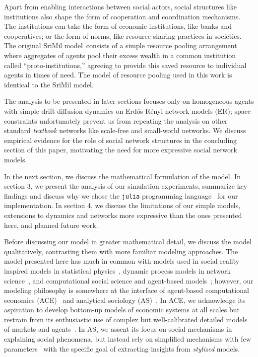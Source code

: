 \documentclass[sigconf]{acmart}
\begin{document}
Apart from enabling interactions between social actors, social structures like institutions also shape the form of cooperation and coordination mechanisms. The institutions can take the form of economic institutions, like banks and cooperatives; or the form of norms, like resource-sharing practices in societies. The original SriMil model~\cite{srimil}consists of a simple resource pooling arrangement where aggregates of agents pool their excess wealth in a common institution called ``proto-institutions,'' agreeing to provide this saved resource to individual agents in times of need. The model of resource pooling used in this work is identical to the SriMil model. 

The analysis to be presented in later sections focuses only on homogeneous agents with simple drift-diffusion dynamics on Erd\H{o}s-R\'{e}nyi network models (ER); space constraints unfortunately prevent us from repeating the analysis on other standard \textit{textbook} networks like scale-free and small-world networks. We discuss empirical evidence for the role of social network structures in the concluding section of this paper, motivating the need for more expressive social network models. 


In the next section, we discuss the mathematical formulation of the model. In section 3, we present the analysis of our simulation experiments, summarize key findings and discuss why we chose the \texttt{julia} programming language~\cite{Julia-2017} for our implementation. In section 4, we discuss the limitations of our simple models, extensions to dynamics and networks more expressive than the ones presented here, and planned future work. 

Before discussing our model in greater mathematical detail, we discuss the model qualitatively, contrasting them with more familiar modeling approaches. The model presented here has much in common with models used in social reality inspired models in statistical physics~\cite{redner2001guide}, dynamic process models in network science~\cite{newman2018networks}, and computational social science and agent-based models~\cite{abm_review}; however, our modeling philosophy is somewhere at the interface of agent-based computational economics (ACE)~\cite{tesfatsion} and analytical sociology (AS)~\cite{ch1as_hdbk,ch2as_hdbk}. In ACE, we acknowledge its aspiration to develop bottom-up models of economic systems at all scales but restrain from its enthusiastic use of complex but well-calibrated detailed models of markets and agents~\cite{tesfatsion2017}. In AS, we assent its focus on social mechanisms in explaining social phenomena, but instead rely on simplified mechanisms with few parameters~\cite{ch11as_hdbk} with the specific goal of extracting insights from \textit{stylized} models.       
\end{document}
